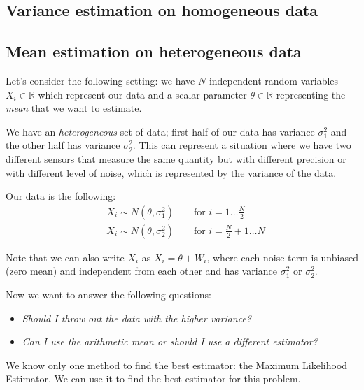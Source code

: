 \subsection{Variance estimation on homogeneous data}
\subsection{Mean estimation on heterogeneous data}

Let's consider the following setting: we have $N$ independent random variables $X_i \in \mathbb{R}$ which represent our data and a scalar parameter $\theta \in \mathbb{R}$ representing the \textit{mean} that we want to estimate.

We have an \textit{heterogeneous} set of data; first half of our data has variance $\sigma_1^2$ and the other half has variance $\sigma_2^2$. This can represent a situation where we have two different sensors that measure the same quantity but with different precision or with different level of noise, which is represented by the variance of the data.

Our data is the following:
\begin{align*}
     & X_i \sim N(\theta, \sigma_1^2) \qquad \text{for } i = 1 \dots \frac{N}{2}     \\
     & X_i \sim N(\theta, \sigma_2^2) \qquad \text{for } i = \frac{N}{2} + 1 \dots N
\end{align*}

Note that we can also write $X_i$ as $X_i = \theta + W_i$, where each noise term is unbiased (zero mean) and independent from each other and has variance $\sigma_1^2$ or $\sigma_2^2$.

Now we want to answer the following questions:
\begin{itemize}
    \item \textit{Should I throw out the data with the higher variance?}
    \item \textit{Can I use the arithmetic mean or should I use a different estimator?}
\end{itemize}

We know only one method to find the best estimator: the Maximum Likelihood Estimator. We can use it to find the best estimator for this problem.


